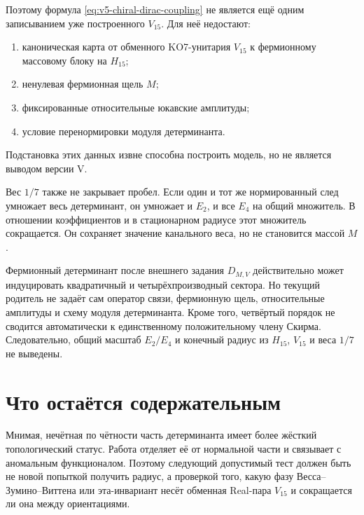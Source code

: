 Поэтому формула \eqref{eq:v5-chiral-dirac-coupling} не является ещё одним
записыванием уже построенного $V_{15}$. Для неё недостают:
\begin{enumerate}
 \item каноническая карта от обменного KO7-унитария $V_{15}$ к
 фермионному массовому блоку на $H_{15}$;
 \item ненулевая фермионная щель $M$;
 \item фиксированные относительные юкавские амплитуды;
 \item условие перенормировки модуля детерминанта.
\end{enumerate}
Подстановка этих данных извне способна построить модель, но не является
выводом версии V.

Вес $1/7$ также не закрывает пробел. Если один и тот же нормированный след
умножает весь детерминант, он умножает и $E_2$, и все $E_4$ на общий
множитель. В отношении коэффициентов и в стационарном радиусе этот
множитель сокращается. Он сохраняет значение канального веса, но не
становится массой $M$.

\begin{theorem}
Фермионный детерминант после внешнего задания $D_{M,V}$ действительно
может индуцировать квадратичный и четырёхпроизводный сектора. Но текущий
родитель не задаёт сам оператор связи, фермионную щель, относительные
амплитуды и схему модуля детерминанта. Кроме того, четвёртый порядок не
сводится автоматически к единственному положительному члену Скирма.
Следовательно, общий масштаб $E_2/E_4$ и конечный радиус из $H_{15}$,
$V_{15}$ и веса $1/7$ не выведены.
\end{theorem}

\section{Что остаётся содержательным}

Мнимая, нечётная по чётности часть детерминанта имеет более жёсткий
топологический статус. Работа  отделяет её от
нормальной части и связывает с аномальным функционалом. Поэтому следующий
допустимый тест должен быть не новой попыткой получить радиус, а проверкой
того, какую фазу Весса--Зумино--Виттена или эта-инвариант несёт обменная
Real-пара $V_{15}$ и сокращается ли она между ориентациями.

